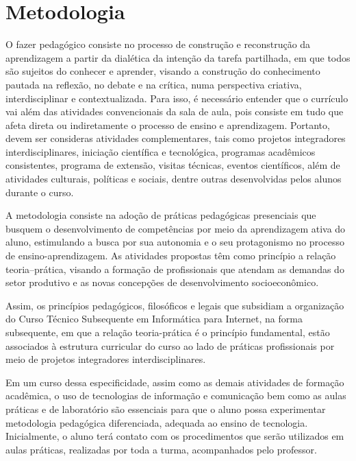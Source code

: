 \documentclass[
	12pt,				%
	openright,			%
	twoside,			%
	a4paper,			%
	chapter=TITLE,		%
	english,			%
	french,				%
	spanish,			%
	brazil,				%
	]{abntex2}
\begin{document}
\chapter{Metodologia}


O fazer pedagógico consiste no processo de construção e reconstrução da aprendizagem a partir da dialética da intenção da tarefa partilhada, em que todos são sujeitos do conhecer e aprender, visando a construção do conhecimento pautada na reflexão, no debate e na crítica, numa perspectiva criativa, interdisciplinar e contextualizada.
%
Para isso, é necessário entender que o currículo vai além das atividades convencionais da sala de aula, pois consiste em tudo que afeta direta ou indiretamente o processo de ensino e aprendizagem. Portanto, devem ser consideras atividades complementares, tais como {projetos integradores} interdisciplinares, iniciação científica e tecnológica, programas acadêmicos consistentes, programa de extensão, visitas técnicas, eventos científicos, além de atividades culturais, políticas e sociais, dentre outras desenvolvidas pelos alunos durante o curso.

A metodologia consiste na adoção de práticas pedagógicas presenciais que busquem o desenvolvimento de competências por meio da aprendizagem ativa do aluno, estimulando a busca por sua autonomia e o seu protagonismo no processo de ensino-aprendizagem. As atividades propostas têm como princípio a relação teoria–prática, visando a formação de profissionais que atendam as demandas do setor produtivo e as novas concepções de desenvolvimento socioeconômico.

Assim, os princípios pedagógicos, filosóficos e legais que subsidiam a organização do Curso Técnico Subsequente em Informática para Internet, na forma subsequente, em que a relação teoria-prática é o princípio fundamental, estão associados à estrutura curricular do curso ao lado de práticas profissionais por meio de projetos integradores interdisciplinares.

Em um curso dessa especificidade, assim como as demais atividades de formação acadêmica, o uso de tecnologias de informação e comunicação bem como as aulas práticas e de laboratório são essenciais para que o aluno possa experimentar metodologia pedagógica diferenciada, adequada ao ensino de tecnologia. Inicialmente, o aluno terá contato com os procedimentos que serão utilizados em aulas práticas, realizadas por toda a turma, acompanhados pelo professor.%
\end{document}
